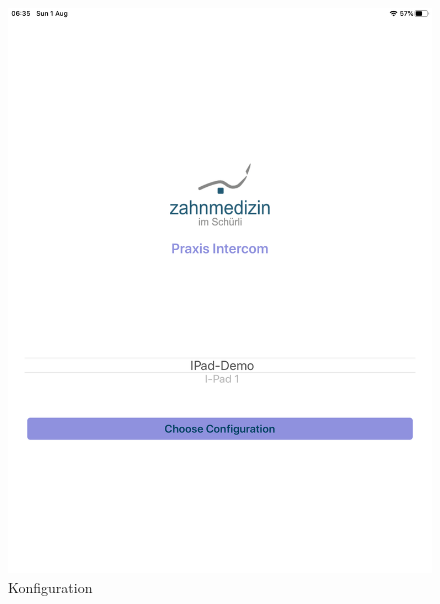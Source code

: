 \begin{figure}[h]
\begin{minipage}[b]{0.4\textwidth}
        \includegraphics[width=\textwidth]{graphics/screenshots/mobileclient/screenshot-select-config}
        \caption{Konfiguration}
    \end{minipage}
    \label{fig:MobileClient-Screens1}
\end{figure}

\clearpage

